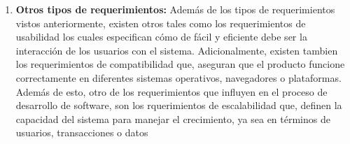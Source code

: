 \begin{enumerate}
    \item \textbf{Otros tipos de requerimientos:} Además de los  tipos de requerimientos vistos anteriormente, existen otros tales como los requerimientos de usabilidad los cuales especifican cómo de fácil y eficiente debe ser la interacción de los usuarios con el sistema. Adicionalmente, existen tambien los requerimientos de compatibilidad que, aseguran que el producto funcione correctamente en diferentes sistemas operativos, navegadores o plataformas. Además de esto, otro de los requerimientos que influyen en el proceso de desarrollo de software, son los rquerimientos de escalabilidad que, definen la capacidad del sistema para manejar el crecimiento, ya sea en términos de usuarios, transacciones o datos
\end{enumerate}